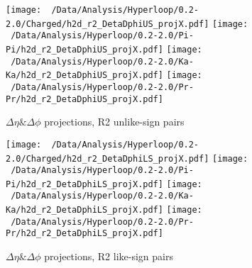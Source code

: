 \documentclass[ALICE,manyauthors]{ALICE_analysis_notes}
\begin{document}
\begin{figure}[H]
	\hfill
	\centering
	\texttt{[image: ~/Data/Analysis/Hyperloop/0.2-2.0/Charged/h2d\_r2\_DetaDphiUS\_projX.pdf]}
	\texttt{[image: ~/Data/Analysis/Hyperloop/0.2-2.0/Pi-Pi/h2d\_r2\_DetaDphiUS\_projX.pdf]}
	\texttt{[image: ~/Data/Analysis/Hyperloop/0.2-2.0/Ka-Ka/h2d\_r2\_DetaDphiUS\_projX.pdf]}
	\texttt{[image: ~/Data/Analysis/Hyperloop/0.2-2.0/Pr-Pr/h2d\_r2\_DetaDphiUS\_projX.pdf]}
	\\
	\hfill
	\caption{$\Delta\eta\&\Delta\phi$ projections, R2 unlike-sign pairs}
\end{figure}
\begin{figure}[H]
	\hfill
	\centering
	\texttt{[image: ~/Data/Analysis/Hyperloop/0.2-2.0/Charged/h2d\_r2\_DetaDphiLS\_projX.pdf]}
	\texttt{[image: ~/Data/Analysis/Hyperloop/0.2-2.0/Pi-Pi/h2d\_r2\_DetaDphiLS\_projX.pdf]}
	\texttt{[image: ~/Data/Analysis/Hyperloop/0.2-2.0/Ka-Ka/h2d\_r2\_DetaDphiLS\_projX.pdf]}
	\texttt{[image: ~/Data/Analysis/Hyperloop/0.2-2.0/Pr-Pr/h2d\_r2\_DetaDphiLS\_projX.pdf]}
	\\
	\hfill
	\caption{$\Delta\eta\&\Delta\phi$ projections, R2 like-sign pairs}
\end{figure}
\end{document}
